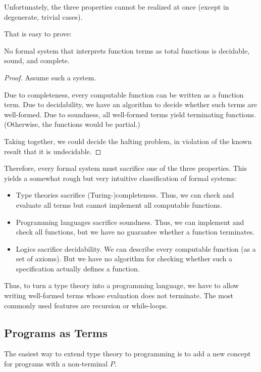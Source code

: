 Unfortunately, the three properties cannot be realized at once (except in degenerate, trivial cases).

That is easy to prove:
\begin{theorem}
No formal system that interprets function terms as total functions is decidable, sound, and complete.
\end{theorem}
\begin{proof}
Assume such a system.

Due to completeness, every computable function can be written as a function term.
Due to decidability, we have an algorithm to decide whether such terms are well-formed.
Due to soundness, all well-formed terms yield terminating functions. (Otherwise, the functions would be partial.)

Taking together, we could decide the halting problem, in violation of the known result that it is undecidable.
\end{proof}

Therefore, every formal system must sacrifice one of the three properties.
This yields a somewhat rough but very intuitive classification of formal systems:
\begin{itemize}
 \item Type theories sacrifice (Turing-)completeness. Thus, we can check and evaluate all terms but cannot implement all computable functions.
 \item Programming languages sacrifice soundness. Thus, we can implement and check all functions, but we have no guarantee whether a function terminates.
 \item Logics sacrifice decidability. We can describe every computable function (as a set of axioms). But we have no algorithm for checking whether such a specification actually defines a function.
\end{itemize}

Thus, to turn a type theory into a programming language, we have to allow writing well-formed terms whose evaluation does not terminate.
The most commonly used features are recursion or while-loops.

\subsection{Programs as Terms}

The easiest way to extend type theory to programming is to add a new concept for programs with a non-terminal $P$.


